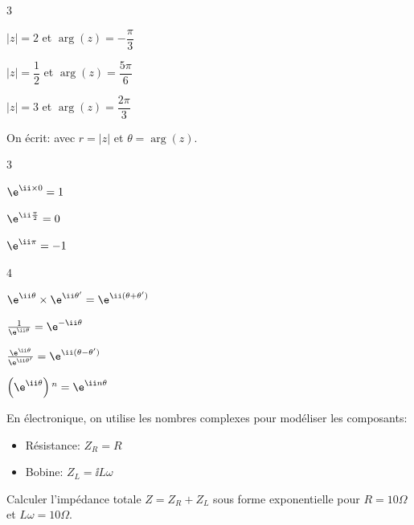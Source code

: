 \begin{exercice_cours}

	\begin{enumerate}

	\end{enumerate}

\end{exercice_cours}



\begin{propriete}
	On écrit:  avec $r = |z|$ et $\theta = \arg(z)$.
\end{propriete}


\begin{propriete}

\begin{enumerate}
	\begin{multicols}{3}
	\item $\e^{\ii \times 0}=1$
	\item $\e^{\ii  \frac{\pi}{2}}=0$
 	\item $\e^{\ii \pi}=-1$

	\end{multicols}

	\begin{multicols}{4}
	\item $\e^{\ii \theta}\times \e^{\ii \theta'}=\e^{\ii (\theta+\theta')}$
	\item $\frac{1}{\e^{\ii \theta}}=\e^{-\ii \theta}$
	\item $\frac{\e^{\ii \theta}}{\e^{\ii \theta'}}=\e^{\ii (\theta-\theta')}$
	\item $\left(\e^{\ii \theta}\right){}^n=\e^{\ii n\theta}$

	\end{multicols}
\end{enumerate}

\end{propriete}


\begin{exercice_cours}
	En électronique, on utilise les nombres complexes pour modéliser les composants:
    \begin{itemize}
        \item Résistance: $Z_R = R$
        \item Bobine: $Z_L = \ii L\omega$
    \end{itemize}
    Calculer l'impédance totale $Z = Z_R + Z_L$ sous forme exponentielle pour $R=10\Omega$ et $L\omega=10\Omega$.
\end{exercice_cours}



